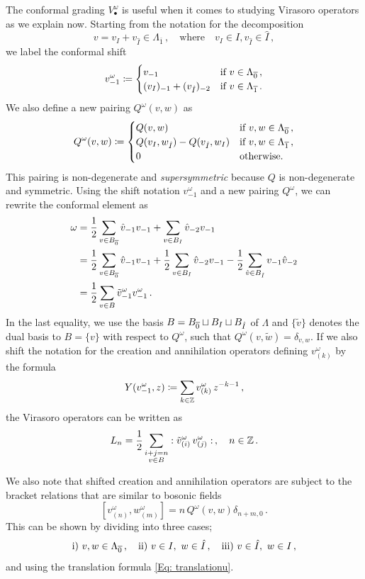 \documentclass[a4paper, 12pt]{amsart}
\begin{document}
The conformal grading $V_\bullet^\omega$ is useful when it comes to studying Virasoro operators as we explain now. Starting from the notation for the decomposition  
$$v=v_I+v_{\hat{I}}\in \Lambda_{\overline{1}} \,,\quad \text{where}\quad  v_{I}\in I, v_{\hat{I}}\in\hat{I}\,,$$
we label the conformal shift
$$v^{\omega}_{-1}\coloneqq \begin{cases}
v_{-1}& \textnormal{if }v\in \Lambda_{\overline{0}}\,,\\
(v_I)_{-1}+(v_{\hat{I}})_{-2}& \textnormal{if }v\in \Lambda_{\overline{1}}\,.
\end{cases}
$$
We also define a new pairing $Q^\omega(v,w)$ as 
$$Q^\omega(v,w)\coloneqq 
\begin{cases}
Q(v,w)&\textnormal{if }v,w\in \Lambda_{\overline{0}}\,,\\
Q(v_I,w_{\hat{I}})-Q(v_{\hat{I}},w_I)&\textnormal{if }v,w\in \Lambda_{\overline{1}}\,,\\
0&\textnormal{otherwise.}
\end{cases}
$$
This pairing is non-degenerate and {\it supersymmetric} because $Q$ is non-degenerate and symmetric. Using the shift notation $v^\omega_{-1}$ and a new pairing $Q^\omega$, we can rewrite the conformal element as
\begin{align}\label{Eq: omega}
    \omega
    &=\frac{1}{2}\sum_{v\in B_{\overline{0}}}\hat{v}_{-1}v_{-1}+\sum_{v\in B_I}\hat{v}_{-2}v_{-1}\\
    &=\frac{1}{2}\sum_{v\in B_{\overline{0}}}\hat{v}_{-1}v_{-1}
    +\frac{1}{2}\sum_{v\in B_I}\hat{v}_{-2}v_{-1}-\frac{1}{2}\sum_{\hat{v}\in B_{\hat{I}}}v_{-1}\hat{v}_{-2}\nonumber\\
    &=\frac{1}{2}\sum_{v\in B} \tilde{v}^\omega_{-1}v^\omega_{-1}\nonumber\,.
\end{align}
In the last equality, we use the basis $B=B_{\overline{0}}\sqcup B_I\sqcup B_{\hat{I}}$ of $\Lambda$ and $\{\tilde{v}\}$ denotes the dual basis to $B=\{v\}$ with respect to $Q^\omega$, such that $Q^\omega(v,\tilde{w})=\delta_{v,w}$. If we also shift the notation for the creation and annihilation operators defining $v^\omega_{(k)}$ by the formula
$$Y(v^\omega_{-1},z)\coloneqq \sum_{k\in {\mathbb{Z}}}v^\omega_{(k)}\,z^{-k-1}\,,
$$
the Virasoro operators can be written as
\begin{equation}\label{eq: operatorsomegashift}
L_n=\frac{1}{2}\sum_{\substack{i+j=n\\ v\in B}} :\tilde{v}^\omega_{(i)}\,v^\omega_{(j)}:\,,\quad n\in {\mathbb{Z}}\,.
\end{equation}

We also note that shifted creation and annihilation operators are subject to the bracket relations that are similar to bosonic fields 
\begin{equation}\label{eq: shifted bracket}
\left[v^{\omega}_{(n)},w^{\omega}_{(m)}\right]= n\, Q^{\omega}(v,w)\delta_{n+m,0}\,.
\end{equation}
This can be shown by dividing into three cases;
$$\textnormal{i) } v, w\in \Lambda_{\overline{0}}\,,\quad 
\textnormal{ii) } v\in I,\ w\in \hat{I}\,,\quad 
\textnormal{iii) } v\in \hat{I},\ w\in I\,,
$$
and using the translation formula \eqref{Eq: translationu}.
\end{document}
